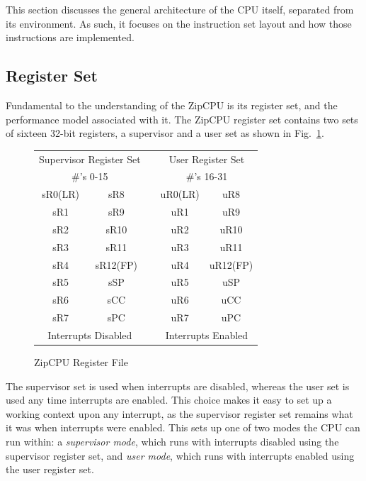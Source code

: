 \documentclass{gqtekspec}
\begin{document}
This section discusses the general architecture of the CPU itself, separated
from its environment.  As such, it focuses on the instruction set layout
and how those instructions are implemented.

\subsection{Register Set}

Fundamental to the understanding of the ZipCPU is its register set, and the
performance model associated with it.
The ZipCPU register set contains two sets of sixteen 32-bit registers, a
supervisor and a user set as shown in Fig.~\ref{fig:regset}.
\begin{figure}\begin{center}
\begin{tabular}{|c|c|c|c|c|}
\multicolumn{2}{c}{Supervisor Register Set} &
	\multicolumn{1}{c}{} &
	\multicolumn{2}{c}{User Register Set} \\
\multicolumn{2}{c}{\#'s 0-15} & \multicolumn{1}{c}{} &
	\multicolumn{2}{c}{\#'s 16-31} \\\hline\hline
sR0(LR)	& sR8	&& uR0(LR) &	uR8	\\\cline{1-2}\cline{4-5}
sR1	& sR9	&& uR1	&	uR9	\\\cline{1-2}\cline{4-5}
sR2	& sR10	&& uR2	&	uR10	\\\cline{1-2}\cline{4-5}
sR3	& sR11	&& uR3	&	uR11	\\\cline{1-2}\cline{4-5}
sR4	& sR12(FP)&& uR4&	uR12(FP)\\\cline{1-2}\cline{4-5}
sR5	& sSP	&& uR5	&	uSP	\\\cline{1-2}\cline{4-5}
sR6	& sCC	&& uR6	&	uCC	\\\cline{1-2}\cline{4-5}
sR7	& sPC	&& uR7	&	uPC	\\\hline\hline
\multicolumn{2}{c}{Interrupts Disabled} &
	\multicolumn{1}{c}{} &
	\multicolumn{2}{c}{Interrupts Enabled} \\
\end{tabular}
\caption{ZipCPU Register File}\label{fig:regset}
\end{center}\end{figure}
The supervisor set is used when interrupts are disabled, whereas the user set
is used any time interrupts are enabled.  This choice makes it easy to set up
a working context upon any interrupt, as the supervisor register set remains
what it was when interrupts were enabled.  This sets up one of two modes
the CPU can run within: a {\em supervisor mode}, which runs with interrupts
disabled using the supervisor register set, and {\em user mode}, which runs
with interrupts enabled using the user register set.
\end{document}
